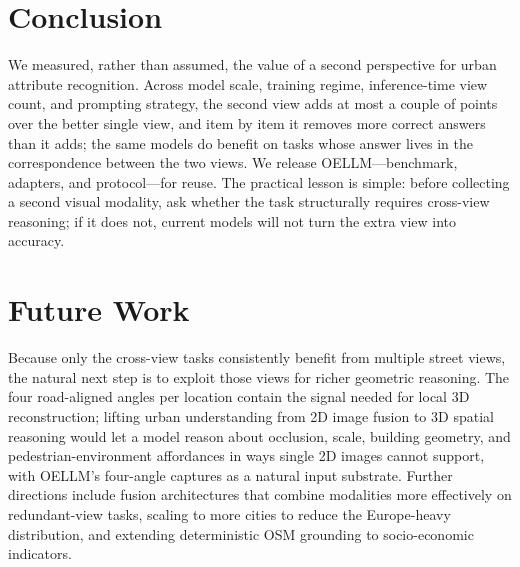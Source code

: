\section{Conclusion}
\label{sec:conclusion}

We measured, rather than assumed, the value of a second perspective for urban
attribute recognition. Across model scale, training regime, inference-time view
count, and prompting strategy, the second view adds at most a couple of points over
the better single view, and item by item it removes more correct answers than it
adds; the same models do benefit on tasks whose answer lives in the correspondence
between the two views. We release OELLM---benchmark, adapters, and protocol---for
reuse. The practical lesson is simple: before collecting a second visual modality,
ask whether the task structurally requires cross-view reasoning; if it does not,
current models will not turn the extra view into accuracy.

\section{Future Work}
\label{sec:future}

Because only the cross-view tasks consistently benefit from multiple street views,
the natural next step is to exploit those views for richer geometric reasoning. The
four road-aligned angles per location contain the signal needed for local 3D
reconstruction; lifting urban understanding from 2D image fusion to 3D spatial
reasoning would let a model reason about occlusion, scale, building geometry, and
pedestrian-environment affordances in ways single 2D images cannot support, with
OELLM's four-angle captures as a natural input substrate. Further directions include
fusion architectures that combine modalities more effectively on redundant-view
tasks, scaling to more cities to reduce the Europe-heavy distribution, and extending
deterministic OSM grounding to socio-economic indicators.
